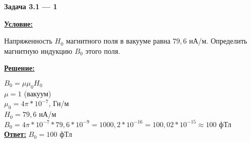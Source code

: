
\begin{center}
    \textbf{Задача 3.1 --- 1}
\end{center}

\underline{\textbf{Условие:}}

Напряженность $ H_0 $ магнитного поля в вакууме равна $ 79,6 $ нА/м.
Определить магнитную индукцию $ B_0 $ этого поля.

\underline{\textbf{Решение:}}

$ B_0 = \mu \mu_0 H_0 $\\

$ \mu = 1 $ (вакуум) \\

$ \mu_0 = 4\pi * 10^{-7} $, Гн/м\\

$ H_0 = 79,6 $ нА/м\\

$ B_0 = 4\pi * 10^{-7} * 79,6 * 10^{-9} =
1000,2 * 10^{-16} = 
100,02 * 10^{-15} \approx
100
$ фТл \\

\underline{\textbf{Ответ:}}
$ B_0 = 100 $ фТл
